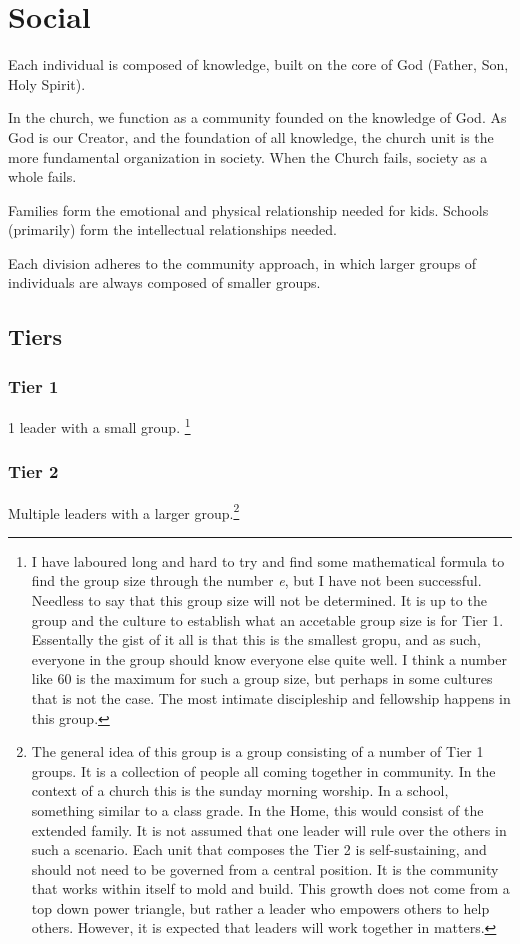 \documentclass[CSHFoundation.tex]{subfiles}
\begin{document}
\section{Social}

Each individual is composed of knowledge, built on the core of God (Father, Son, Holy Spirit).

In the church, we function as a community founded on the knowledge of God. As God is our Creator, and the foundation of all knowledge, the church unit is the more fundamental organization in society. When the Church fails, society as a whole fails.

Families form the emotional and physical relationship needed for kids. Schools (primarily) form the intellectual relationships needed.

Each division adheres to the community approach, in which larger groups of individuals are always composed of smaller groups.


\subsection{Tiers}



\subsubsection{Tier 1}

1 leader with a small group. \footnote{I have laboured long and hard to try and find some mathematical formula to find the group size through the number \textit{e}, but I have not been successful. Needless to say that this group size will not be determined. It is up to the group and the culture to establish what an accetable group size is for Tier 1. Essentally the gist of it all is that this is the smallest gropu, and as such, everyone in the group should know everyone else quite well. I think a number like 60 is the maximum for such a group size, but perhaps in some cultures that is not the case. The most intimate discipleship and fellowship happens in this group.}

\subsubsection{Tier 2}

Multiple leaders with a larger group.\footnote{The general idea of this group is a group consisting of a number of Tier 1 groups. It is a collection of people all coming together in community. In the context of a church this is the sunday morning worship. In a school, something similar to a class grade. In the Home, this would consist of the extended family. It is not assumed that one leader will rule over the others in such a scenario. Each unit that composes the Tier 2 is self-sustaining, and should not need to be governed from a central position. It is the community that works within itself to mold and build. This growth does not come from a top down power triangle, but rather a leader who empowers others to help others. However, it is expected that leaders will work together in matters.}
\end{document}
